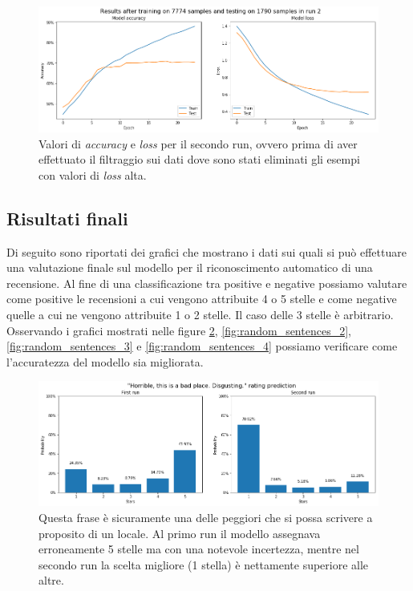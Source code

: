\documentclass[12pt]{article}
\begin{document}
\begin{figure}[H]
\centering
\includegraphics[width=\textwidth]{images/accuracy_loss_run2.png}
\caption{Valori di \textit{accuracy} e \textit{loss} per il secondo run, ovvero prima di aver effettuato il filtraggio sui dati dove sono stati eliminati gli esempi con valori di \textit{loss} alta.}
\label{fig:run2}
\end{figure}

\subsection{Risultati finali}
Di seguito sono riportati dei grafici che mostrano i dati sui quali si può effettuare una valutazione finale sul modello per il riconoscimento automatico di una recensione. \newline
Al fine di una classificazione tra positive e negative possiamo valutare come positive le recensioni a cui vengono attribuite 4 o 5 stelle e come negative quelle a cui ne vengono attribuite 1 o 2 stelle. Il caso delle 3 stelle è arbitrario.\newline
Osservando i grafici mostrati nelle figure \ref{fig:random_sentences_1}, \ref{fig:random_sentences_2}, \ref{fig:random_sentences_3} e \ref{fig:random_sentences_4} possiamo verificare come l'accuratezza del modello sia migliorata.
\begin{figure}[H]
\centering
\includegraphics[width=\textwidth]{images/sent1.png}
\caption{Questa frase è sicuramente una delle peggiori che si possa scrivere a proposito di un locale. Al primo run il modello assegnava erroneamente 5 stelle ma con una notevole incertezza, mentre nel secondo run la scelta migliore (1 stella) è nettamente superiore alle altre.}
\label{fig:random_sentences_1}
\end{figure}
\end{document}
